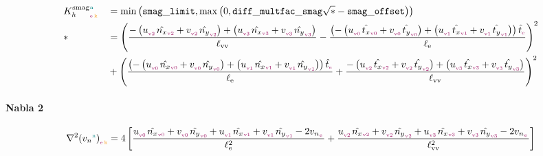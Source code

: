 \begin{equation}
  \begin{aligned}
    & \Khsmag{\n}{\e}{\k} &&= \min{\left(\smaglimit, \max{\left(0, \diffmultfacsmag \sqrt{ * } - \smagoffset \right)} \right)} \\
    & * &&= \left(
            \frac{
                - \left( \windu{}{\v 2}{} \orientationnormx{\v 2} + \windv{}{\v 2}{} \orientationnormy{\v 2} \right)
                + \left( \windu{}{\v 3}{} \orientationnormx{\v 3} + \windv{}{\v 3}{} \orientationnormy{\v 3} \right)
            }{\Lvertvert}
            - \frac{\left(
                - \left( \windu{}{\v 0}{} \orientationtangx{\v 0} + \windv{}{\v 0}{} \orientationtangy{\v 0} \right)
                + \left( \windu{}{\v 1}{} \orientationtangx{\v 1} + \windv{}{\v 1}{} \orientationtangy{\v 1} \right)
            \right)\orientationtang{\e}}{\Ledge}
        \right)^2 \\
    &   &&+ \left(
            \frac{\left(
                - \left( \windu{}{\v 0}{} \orientationnormx{\v 0} + \windv{}{\v 0}{} \orientationnormy{\v 0} \right)
                + \left( \windu{}{\v 1}{} \orientationnormx{\v 1} + \windv{}{\v 1}{} \orientationnormy{\v 1} \right)
            \right)\orientationtang{\e}}{\Ledge}
            + \frac{
                - \left( \windu{}{\v 2}{} \orientationtangx{\v 2} + \windv{}{\v 2}{} \orientationtangy{\v 2} \right)
                + \left( \windu{}{\v 3}{} \orientationtangx{\v 3} + \windv{}{\v 3}{} \orientationtangy{\v 3} \right)
            }{\Lvertvert}
        \right)^2
  \end{aligned}
\end{equation}

\paragraph{Nabla 2}

\begin{equation}
  \vnlapl{\n}{\e}{\k} = 4 \left[
      \frac{
          \windu{}{\v 0}{} \orientationnormx{\v 0} + \windv{}{\v 0}{} \orientationnormy{\v 0}
        + \windu{}{\v 1}{} \orientationnormx{\v 1} + \windv{}{\v 1}{} \orientationnormy{\v 1}
        - 2 \vn{}{\e}{}
      }{\Ledge^2}
      + \frac{
          \windu{}{\v 2}{} \orientationnormx{\v 2} + \windv{}{\v 2}{} \orientationnormy{\v 2}
        + \windu{}{\v 3}{} \orientationnormx{\v 3} + \windv{}{\v 3}{} \orientationnormy{\v 3}
        - 2 \vn{}{\e}{}
      }{\Lvertvert^2}
    \right]
\end{equation}

